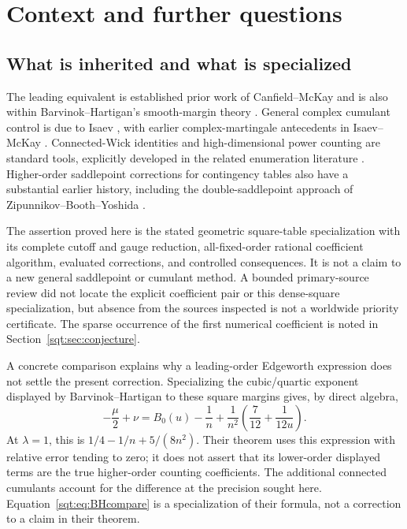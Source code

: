 \section{Context and further questions}\label{sqt:sec:outlook}
\subsection{What is inherited and what is specialized}
The leading equivalent is established prior work of Canfield--McKay \cite{CM} and is also within Barvinok--Hartigan's smooth-margin theory \cite{BH}. General complex cumulant control is due to Isaev \cite{Isaev}, with earlier complex-martingale antecedents in Isaev--McKay \cite{IM2018}. Connected-Wick identities and high-dimensional power counting are standard tools, explicitly developed in the related enumeration literature \cite{IM,IMZ}. Higher-order saddlepoint corrections for contingency tables also have a substantial earlier history, including the double-saddlepoint approach of Zipunnikov--Booth--Yoshida \cite{ZBY}.

The assertion proved here is the stated geometric square-table specialization with its complete cutoff and gauge reduction, all-fixed-order rational coefficient algorithm, evaluated corrections, and controlled consequences. It is not a claim to a new general saddlepoint or cumulant method. A bounded primary-source review did not locate the explicit coefficient pair or this dense-square specialization, but absence from the sources inspected is not a worldwide priority certificate. The sparse occurrence of the first numerical coefficient is noted in Section~\ref{sqt:sec:conjecture}.

A concrete comparison explains why a leading-order Edgeworth expression does not settle the present correction. Specializing the cubic/quartic exponent displayed by Barvinok--Hartigan to these square margins gives, by direct algebra,
\begin{equation}\label{sqt:eq:BHcompare}
-\frac\mu2+\nu=B_0(u)-\frac1n+
\frac1{n^2}\left(\frac7{12}+\frac1{12u}\right).
\end{equation}
At $\lambda=1$, this is $1/4-1/n+5/(8n^2)$. Their theorem uses this expression with relative error tending to zero; it does not assert that its lower-order displayed terms are the true higher-order counting coefficients. The additional connected cumulants account for the difference at the precision sought here. Equation~\eqref{sqt:eq:BHcompare} is a specialization of their formula, not a correction to a claim in their theorem.

